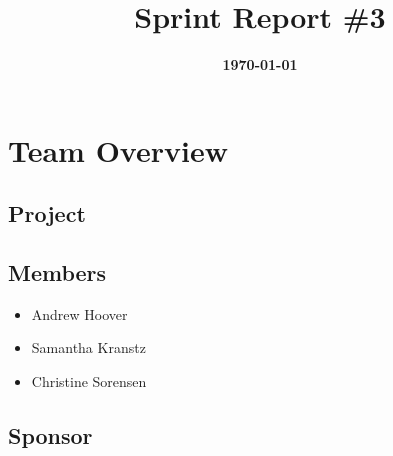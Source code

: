 \documentclass{article}
\title{\normalfont\Large\bfseries\color{TitleColor}Sprint Report \#3}
\date{\normalfont\bfseries\color{TitleColor}\today}
\begin{document}
\maketitle

\section*{Team Overview}
\subsection*{Project}

\subsection*{Members}
\begin{itemize}
	\item Andrew Hoover
	\item Samantha Kranstz
	\item Christine Sorensen
\end{itemize}

\subsection*{Sponsor}
\end{document}
